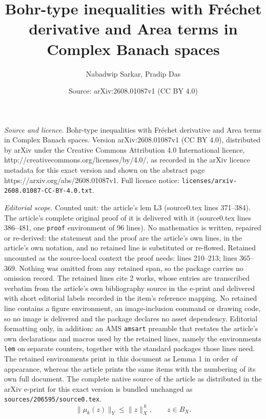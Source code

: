 \documentclass[10pt,a4paper]{amsart}
\title{Bohr-type inequalities with Fr\'{e}chet derivative and Area terms in Complex Banach spaces}
\author{Nabadwip Sarkar, Pradip Das}
\date{Source: arXiv:2608.01087v1 (CC BY 4.0)}
\begin{document}
\maketitle

\noindent\emph{Source and licence.} Bohr-type inequalities with Fr\'{e}chet derivative and Area terms in Complex Banach spaces. Version arXiv:2608.01087v1 (CC BY 4.0), distributed by arXiv under the Creative Commons Attribution 4.0 International licence, http://creativecommons.org/licenses/by/4.0/, as recorded in the arXiv licence metadata for this exact version and shown on the abstract page https://arxiv.org/abs/2608.01087v1. Full licence notice: \texttt{licenses/arxiv-2608.01087-CC-BY-4.0.txt}.\par\smallskip

\noindent\textit{Editorial scope.} Counted unit: the article's lem L3 (source0.tex lines 371--384). The article's complete original proof of it is delivered with it (source0.tex lines 386--481, one \texttt{proof} environment of 96 lines). No mathematics is written, repaired or re-derived: the statement and the proof are the article's own lines, in the article's own notation, and no retained line is substituted or re-flowed.  Retained uncounted as the source-local context the proof needs: lines 210--213; lines 365--369.  Nothing was omitted from any retained span, so the package carries no omission record.  The retained lines cite 2 works, whose entries are transcribed verbatim from the article's own bibliography source in the e-print and delivered with short editorial labels recorded in the item's reference mapping.  No retained line contains a figure environment, an image-inclusion command or drawing code, so no image is delivered and the package declares no asset dependency.  Editorial formatting only, in addition: an AMS \texttt{amsart} preamble that restates the article's own declarations and macros used by the retained lines, namely the environments \texttt{lem} on separate counters, together with the standard packages those lines need.  The retained environments print in this document as Lemma 1 in order of appearance, whereas the article prints the same items with the numbering of its own full document.  The complete native source of the article as distributed in the arXiv e-print for this exact version is bundled unchanged as \texttt{sources/206595/source0.tex}.
\begin{equation}
\|\mu_k(z)\|_Y \le \|z\|_X^{\,k}, \qquad z\in B_X.
\label{eq:Schwarz}
\end{equation}
\end{document}
